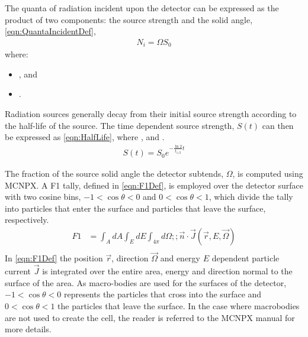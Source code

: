 The quanta of radiation incident upon the detector can be expressed as the product of two components: the source strength and the solid angle, \eqref{eqn:QuantaIncidentDef},
\begin{align}
  \label{eqn:QuantaIncidentDef}
  N_i = \Omega S_0
\end{align}
where:
\begin{itemize}
  \item[] , and 
  \item[] .
\end{itemize}
Radiation sources generally decay from their initial source strength according to the half-life of the source.
The time dependent source strength, $S(t)$ can then be expressed as \eqref{eqn:HalfLife}, where ,  and .
\begin{align}
  \label{eqn:HalfLife}
  S(t) = S_0 e^{-\frac{\ln{2}}{t_{1/2}} t}
\end{align}

The fraction of the source solid angle the detector subtends, $\Omega$, is computed using MCNPX. 
A F1 tally, defined in \eqref{eqn:F1Def}, is employed over the detector surface with two cosine bins, $-1<\cos\theta<0$ and $0<\cos\theta<1$, which divide the tally into particles that enter the surface and particles that leave the surface, respectively.
\begin{align}
  \label{eqn:F1Def}
  F1 &= \int_A dA \int_E dE \int_{4\pi} d\Omega ;;\vec{n}\cdot\vec{J}(\vec{r},E,\vec{\Omega}) \\
\end{align}
In \eqref{eqn:F1Def} the position $\vec{r}$, direction $\vec{\Omega}$ and energy $E$  dependent particle current $\vec{J}$  is integrated over the entire area, energy and direction normal to the surface of the area.
As macro-bodies are used for the surfaces of the detector, $-1<\cos\theta<0$ represents the particles that cross into the surface and $0<\cos\theta<1$ the particles that leave the surface.
In the case where macrobodies are not used to create the cell, the reader is referred to the MCNPX manual for more details.

